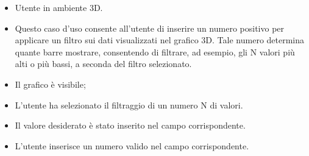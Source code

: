 \UCdsc
{ %
    \begin{itemize}
        \item Utente in ambiente 3D.
    \end{itemize}
}
{ %
    \begin{itemize}
        \item Questo caso d'uso consente all'utente di inserire un numero positivo per applicare un filtro sui dati visualizzati nel grafico 3D. Tale numero determina quante barre mostrare, consentendo di filtrare, ad esempio, gli N valori più alti o più bassi, a seconda del filtro selezionato.
    \end{itemize}
}
{ %
    \begin{itemize}
        \item Il grafico è visibile;
        \item L'utente ha selezionato il filtraggio di un numero N di valori.
    \end{itemize}
}
{ %
    \begin{itemize}
        \item Il valore desiderato è stato inserito nel campo corrispondente.
    \end{itemize}
}
{ %
    \begin{itemize}
        \item L'utente inserisce un numero valido nel campo corrispondente.
    \end{itemize}
}



